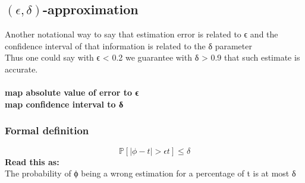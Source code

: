 \subsection{$(\epsilon, \delta)$-approximation}

Another notational way to say that estimation error is related to ϵ and the confidence interval of that information is related to the δ parameter
\\
Thus one could say with ϵ < 0.2 we guarantee with δ > 0.9 that such estimate is accurate.
\\\\
\textbf{map absolute value of error to ϵ}
\\
\textbf{map confidence interval to δ}

\subsubsection{Formal definition}

\begin{equation}
	\mathds{P}[|\phi - t| > \epsilon t] \le \delta
	\label{eq:eps-delta approximtion}
\end{equation}
\textbf{Read this as:}
\\
The probability of ϕ being a wrong estimation for a percentage of t is at most δ
